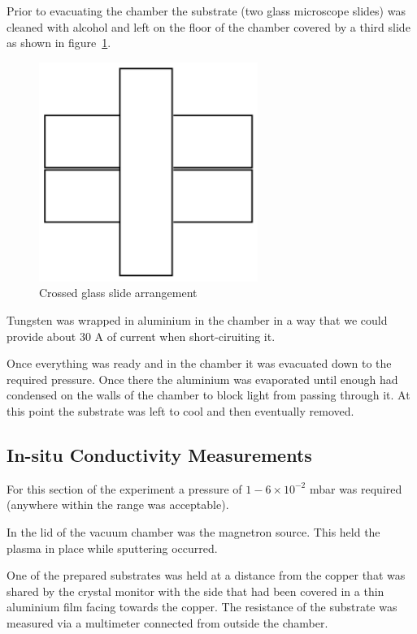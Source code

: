 \documentclass[aps,prl,twocolumn,groupedaddress,showkeys]{revtex4}
\begin{document}
Prior to evacuating the chamber the substrate (two glass microscope slides) was cleaned with alcohol and left on the floor of the chamber covered by a third slide as shown in figure~\ref{fig:slideArrangement}.

\begin{figure}[h]
	\includegraphics[width=0.6\linewidth]{glassSlideArrangement.png}
	\caption{Crossed glass slide arrangement\cite{labbook}}
	\label{fig:slideArrangement}
\end{figure}

Tungsten was wrapped in aluminium in the chamber in a way that we could provide about 30 A of current when short-ciruiting it.

Once everything was ready and in the chamber it was evacuated down to the required pressure. Once there the aluminium was evaporated until enough had condensed on the walls of the chamber to block light from passing through it. At this point the substrate was left to cool and then eventually removed.


\subsection{In-situ Conductivity Measurements}

For this section of the experiment a pressure of $1-6\times10^{-2}$ mbar was required (anywhere within the range was acceptable).

In the lid of the vacuum chamber was the magnetron source. This held the plasma in place while sputtering occurred.

One of the prepared substrates was held at a distance from the copper that was shared by the crystal monitor with the side that had been covered in a thin aluminium film facing towards the copper. The resistance of the substrate was measured via a multimeter connected from outside the chamber.
\end{document}
